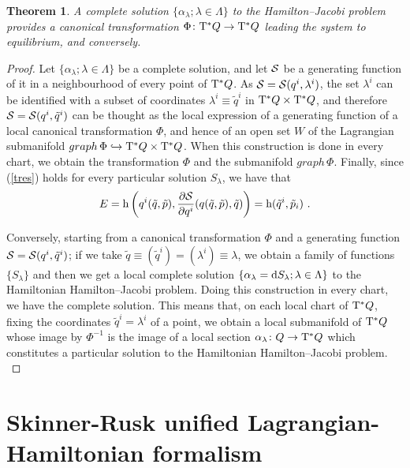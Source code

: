 \documentclass[12pt]{report}
\newtheorem{teor}{Theorem}[chapter]
\def\derpar#1#2{\frac{\partial{#1}}{\partial{#2}}}
\def\qed{\ifvmode\removelastskip\fi
{\unskip\nobreak\hfil\penalty50\hbox{}\nobreak\hfil
\hbox{\vrule height1.2ex width1.2ex}\parfillskip=0pt
\finalhyphendemerits=0 \par\smallskip}}
\def\d{{\rm d}}
\def\Tan{{\rm T}}
\begin{document}
\begin{teor}
A complete solution $\{ \alpha_\lambda; \lambda\in\Lambda\}$
to the Hamilton--Jacobi problem provides a canonical transformation 
$\Phi\colon \Tan^*Q\to \Tan^*Q$ leading the system to equilibrium,
and conversely.
\end{teor}
\begin{proof}
Let $\{ \alpha_\lambda; \lambda\in\Lambda\}$ be a complete solution, and
let ${\cal S}$ be a generating function of it
in a neighbourhood of every point of $\Tan^*Q$.
As ${\cal S}={\cal S}(q^i,\lambda^i)$, the set $\lambda^i$ can be identified
with a subset  of coordinates $\lambda^i\equiv\tilde q^i$ in $\Tan^*Q\times\Tan^*Q$, 
and therefore ${\cal S}={\cal S}(q^i,\tilde q^i)$ can be thought as
the local expression of a generating function
of a  local canonical transformation $\Phi$, and hence
of an open set $W$ of the Lagrangian submanifold 
$graph\,\Phi\hookrightarrow \Tan^*Q\times\Tan^*Q$.
When this construction is done in every chart, we obtain the transformation $\Phi$
and the submanifold $graph\,\Phi$.
Finally, since (\ref{tres}) holds for every particular solution $S_\lambda$, we have that
$$
E={\rm h}\left(q^i(\tilde q,\tilde p),\derpar{{\cal S}}{q^i}(q(\tilde q,\tilde p),\tilde q)\right)= 
{\rm h}(\tilde q^i,\tilde p_i) \ .
$$

Conversely, starting from a canonical transformation $\Phi$ and a
generating function ${\cal S}={\cal S}(q^i,\tilde q^i)$;
if we take $\tilde q\equiv (\tilde q^i)=(\lambda^i)\equiv\lambda$, we obtain
a family of functions $\{ S_\lambda\}$ and then we get a
local complete solution $\{\alpha_\lambda=\d S_\lambda; \lambda\in\Lambda\}$
to the Hamiltonian Hamilton--Jacobi problem.
Doing this construction in every chart, we have the complete solution.
This means that, on each local chart of $\Tan^*Q$,
fixing the coordinates $\tilde q^i=\lambda^i$ of a point,
we obtain a local submanifold of $\Tan^*Q$ whose image by $\Phi^{-1}$ is
the image of a local section $\alpha_\lambda\colon Q\to \Tan^*Q$
which constitutes a particular solution to the Hamiltonian Hamilton--Jacobi problem.
\\ \qed \end{proof}



\section{Skinner-Rusk unified Lagrangian-Hamiltonian formalism}
\label{SRuf}
\end{document}
